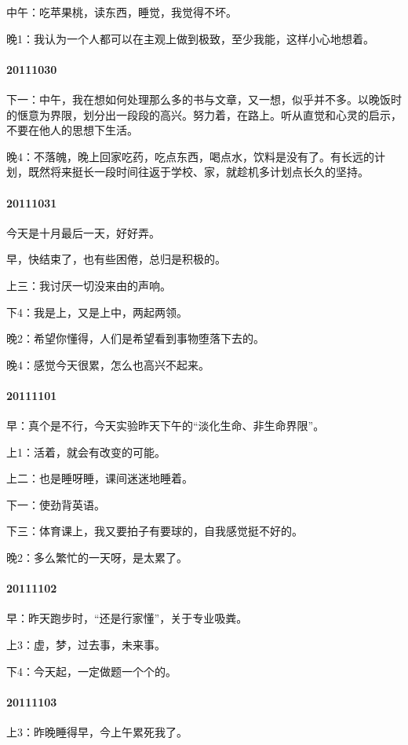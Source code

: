 \documentclass[UTF8]{book}
\begin{document}
中午：吃苹果桃，读东西，睡觉，我觉得不坏。

晚1：我认为一个人都可以在主观上做到极致，至少我能，这样小心地想着。

\paragraph{20111030}
下一：中午，我在想如何处理那么多的书与文章，又一想，似乎并不多。以晚饭时的惬意为界限，划分出一段段的高兴。努力着，在路上。听从直觉和心灵的启示，不要在他人的思想下生活。

晚4：不落魄，晚上回家吃药，吃点东西，喝点水，饮料是没有了。有长远的计划，既然将来挺长一段时间往返于学校、家，就趁机多计划点长久的坚持。

\paragraph{20111031}
今天是十月最后一天，好好弄。

早，快结束了，也有些困倦，总归是积极的。

上三：我讨厌一切没来由的声响。

下4：我是上，又是上中，两起两领。

晚2：希望你懂得，人们是希望看到事物堕落下去的。

晚4：感觉今天很累，怎么也高兴不起来。


\paragraph{20111101}
早：真个是不行，今天实验昨天下午的“淡化生命、非生命界限”。

上1：活着，就会有改变的可能。

上二：也是睡呀睡，课间迷迷地睡着。

下一：使劲背英语。

下三：体育课上，我又要拍子有要球的，自我感觉挺不好的。

晚2：多么繁忙的一天呀，是太累了。


\paragraph{20111102}
早：昨天跑步时，“还是行家懂”，关于专业吸粪。

上3：虚，梦，过去事，未来事。

下4：今天起，一定做题一个个的。


\paragraph{20111103}
上3：昨晚睡得早，今上午累死我了。
\end{document}

